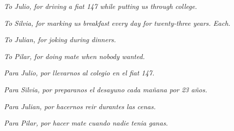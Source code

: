 \cleardoublepage

\begin{dedication}
\emph{To Julio, for driving a fiat 147 while putting us through college.}

\emph{To Silvia, for marking us breakfast every day for twenty-three years. Each.} 

\emph{To Julian, for joking during dinners.}

 \emph{To Pilar, for doing mate when nobody wanted.\\}
 


\emph{Para Julio, por llevarnos al colegio en el fiat 147.}

\emph{Para Silvia, por preparanos el desayuno cada ma\~nana por 23 a\~nos.}

\emph{Para Julian, por hacernos reir durantes las cenas.}

\emph{Para Pilar, por hacer mate cuando nadie tenia ganas.}
\end{dedication}


